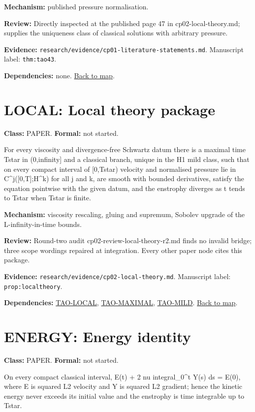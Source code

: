 \documentclass[10pt]{article}
\begin{document}
\textbf{Mechanism:} published pressure normalisation.

\textbf{Review:} Directly inspected at the published page 47 in cp02-local-theory.md; supplies the uniqueness class of classical solutions with arbitrary pressure.

\textbf{Evidence:} \texttt{research/evidence/cp01-literature-statements.md}. Manuscript label: \texttt{thm:tao43}.

\textbf{Dependencies:} none. \hyperref[map]{Back to map}.

\section*{LOCAL: Local theory package}\label{node:LOCAL}
\textbf{Class:} PAPER. \textbf{Formal:} not started.

For every viscosity and divergence-free Schwartz datum there is a maximal time Tstar in (0,infinity] and a classical branch, unique in the H1 mild class, such that on every compact interval of [0,Tstar) velocity and normalised pressure lie in C\textasciicircum{}j([0,T];H\textasciicircum{}k) for all j and k, are smooth with bounded derivatives, satisfy the equation pointwise with the given datum, and the enstrophy diverges as t tends to Tstar when Tstar is finite.

\textbf{Mechanism:} viscosity rescaling, gluing and supremum, Sobolev upgrade of the L-infinity-in-time bounds.

\textbf{Review:} Round-two audit cp02-review-local-theory-r2.md finds no invalid bridge; three scope wordings repaired at integration. Every other paper node cites this package.

\textbf{Evidence:} \texttt{research/evidence/cp02-local-theory.md}. Manuscript label: \texttt{prop:localtheory}.

\textbf{Dependencies:} \hyperref[node:TAO-LOCAL]{TAO-LOCAL}, \hyperref[node:TAO-MAXIMAL]{TAO-MAXIMAL}, \hyperref[node:TAO-MILD]{TAO-MILD}. \hyperref[map]{Back to map}.

\section*{ENERGY: Energy identity}\label{node:ENERGY}
\textbf{Class:} PAPER. \textbf{Formal:} not started.

On every compact classical interval, E(t) + 2 nu integral\_0\textasciicircum{}t Y(s) ds = E(0), where E is squared L2 velocity and Y is squared L2 gradient; hence the kinetic energy never exceeds its initial value and the enstrophy is time integrable up to Tstar.
\end{document}

